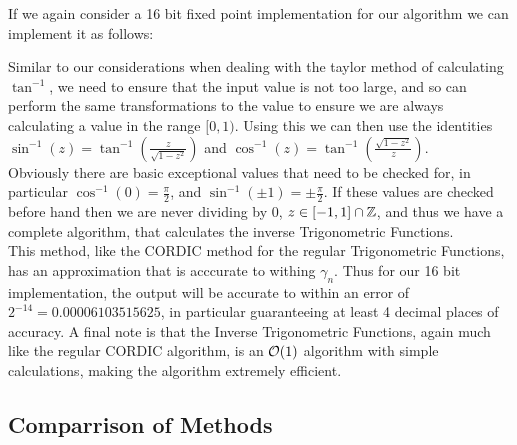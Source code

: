 {If we again consider a 16 bit fixed point implementation for our algorithm we can implement it as follows:


Similar to our considerations when dealing with the taylor method of calculating \(\tan^{-1}\), we need to ensure that the input value is not too large, and so can perform the same transformations to the value to ensure we are always calculating a value in the range \([0,1)\). Using this we can then use the identities \(\sin^{-1}(z) = \tan^{-1}(\frac{z}{\sqrt{1-z^2}})\) and \(\cos^{-1}(z) = \tan^{-1}(\frac{\sqrt{1 - z^2}}{z})\). \\

Obviously there are basic exceptional values that need to be checked for, in particular \(\cos^{-1}(0) = \tfrac{\pi}{2}\), and \(\sin^{-1}(\pm1) = \pm\tfrac{\pi}{2}\). If these values are checked before hand then we are never dividing by 0, \(z \in [-1,1]\cap\mathbb{Z}\), and thus we have a complete algorithm, that calculates the inverse Trigonometric Functions.\\

This method, like the CORDIC method for the regular Trigonometric Functions, has an approximation that is acccurate to withing \(\gamma_n\). Thus for our 16 bit implementation, the output will be accurate to within an error of \(2^{-14} = 0.00006103515625\), in particular guaranteeing at least 4 decimal places of accuracy. A final note is that the Inverse Trigonometric Functions, again much like the regular CORDIC algorithm, is an \(\mathcal{O}(1)\) algorithm with simple calculations, making the algorithm extremely efficient.

\subsection{Comparrison of Methods}

}
